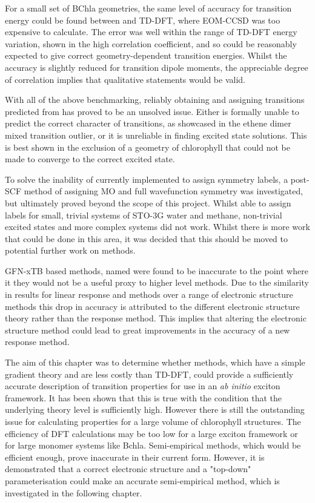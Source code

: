 For a small set of BChla geometries, the same level of accuracy for transition energy 
could be found between \dscf and TD-DFT, where EOM-CCSD was too expensive to calculate.
The error was well within the range of TD-DFT energy variation, shown in the high
correlation coefficient, and so \dscf could be reasonably expected to give correct
geometry-dependent transition energies. Whilst the accuracy is slightly reduced 
for transition dipole moments, the appreciable degree of correlation implies that
qualitative statements would be valid.

With all of the above benchmarking, reliably obtaining and assigning transitions
predicted from \dscf has proved to be an unsolved issue. Either \dscf is formally
unable to predict the correct character of transitions, as showcased in the ethene 
dimer mixed transition outlier, or it is unreliable in finding excited state solutions.
This is best shown in the exclusion of a geometry of chlorophyll that could not
be made to converge to the correct excited state.

To solve the inability of currently implemented \dscf to assign symmetry labels,
a post-SCF method of assigning MO and full wavefunction symmetry was investigated,
but ultimately proved beyond the scope of this project. Whilst able to assign labels
for small, trivial systems of STO-3G water and methane, non-trivial excited states
and more complex systems did not work. Whilst there is more work that could be done
in this area, it was decided that this should be moved to potential further work
on \dscf methods.

GFN-xTB based methods, named \dxtb were found to be inaccurate to the point where
it they would not be a useful proxy to higher level methods. Due to the similarity
in results for linear response and \dscf methods over a range of electronic structure
methods this drop in accuracy is attributed to the different electronic structure 
theory rather than the response method. This implies that altering the electronic
structure method could lead to great improvements in the accuracy of a new response 
method.

The aim of this chapter was to determine whether \dscf methods, which have a simple
gradient theory and are less costly than TD-DFT, could provide a sufficiently accurate
description of transition properties for use in an \emph{ab initio} exciton framework.
It has been shown that this is true with the condition that the underlying theory 
level is sufficiently high. However there is still the outstanding issue for calculating
properties for a large volume of  chlorophyll structures. The efficiency of DFT 
calculations may be too low for a large exciton framework or for large monomer systems
like Bchla. Semi-empirical \dscf methods, which would be efficient enough, prove 
inaccurate in their current form. However, it is demonstrated that a correct electronic 
structure and a "top-down" parameterisation could make an accurate semi-empirical
method, which is investigated in the following chapter.
